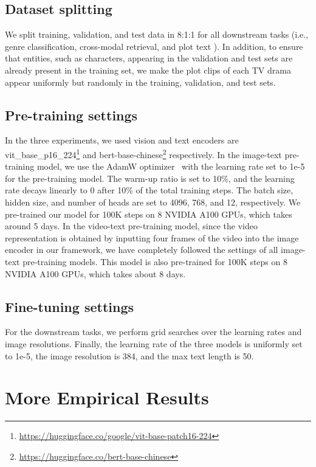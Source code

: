 \subsection{Dataset splitting}
\label{sec:app_dataset_splitting}

We split training, validation, and test data in 8:1:1 for all downstream tasks (i.e., genre classification, cross-modal retrieval, and plot text ).
In addition, to ensure that entities, such as characters, appearing in the validation and test sets are already present in the training set, we make the plot clips of each TV drama appear uniformly but randomly in the training, validation, and test sets.


\subsection{Pre-training settings}
\label{sec:app_pretrain_setting}

In the three experiments, we used vision and text encoders are vit\_base\_p16\_224\footnote{\url{https://huggingface.co/google/vit-base-patch16-224}} and bert-base-chinese\footnote{\url{https://huggingface.co/bert-base-chinese}} respectively.
In the image-text pre-training model, we use the AdamW optimizer~\citep{adamw2017axriv} with the learning rate set to 1e-5 for the pre-training model.
The warm-up ratio is set to 10\%, and the learning rate decays linearly to 0 after 10\% of the total training steps.
The batch size, hidden size, and number of heads are set to 4096, 768, and 12, respectively.
We pre-trained our model for 100K steps on 8 NVIDIA A100 GPUs, which takes around 5 days.
In the video-text pre-training model, since the video representation is obtained by inputting four frames of the video into the image encoder in our framework, we have completely followed the settings of all image-text pre-training models. 
This model is also pre-trained for 100K steps on 8 NVIDIA A100 GPUs, which takes about 8 days.


\subsection{Fine-tuning settings}
\label{sec:app_finetune_setting}

For the downstream tasks, we perform grid searches over the learning rates and image resolutions. 
Finally, the learning rate of the three models is uniformly set to 1e-5, the image resolution is 384, and the max text length is 50.


\section{More Empirical Results}
\label{sec:app_additional_exp_res}

